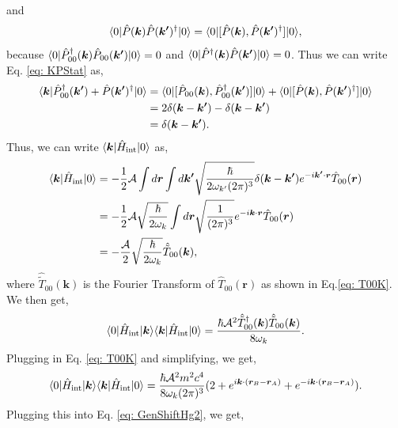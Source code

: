 \documentclass[12pt,a4paper]{report}
\theoremstyle{plain}
\theoremstyle{definition}
\theoremstyle{remark}
\renewcommand{\dag}{\dagger}
\newcommand{\Hint}{\hat{H}_{\text{int}}}
\DeclarePairedDelimiter\bra{\langle}{\rvert}
\DeclarePairedDelimiter\ket{\lvert}{\rangle}
\begin{document}
and
\begin{equation}
    \bra{0}\hat{P}(\bm{k})\hat{P}(\bm{k'})^{\dag}\ket{0} = \bra{0}[\hat{P}(\bm{k}), \hat{P}(\bm{k'})^{\dag}]\ket{0},
\end{equation}
because $\bra{0}\hat{P}_{00}^{\dag}(\bm{k})\hat{P}_{00}(\bm{k'})\ket{0} = 0$ and $\bra{0}\hat{P}^{\dag}(\bm{k})\hat{P}(\bm{k'})\ket{0} = 0$. Thus we can write Eq. \ref{eq: KPStat} as,
\begin{equation}
    \begin{aligned}
        \bra{\bm{k}}\hat{P}_{00}^{\dag}(\bm{k'}) + \hat{P}(\bm{k'})^{\dag}\ket{0} &= \bra{0}[\hat{P}_{00}(\bm{k}), \hat{P}_{00}^{\dag}(\bm{k'})]\ket{0} + \bra{0}[\hat{P}(\bm{k}), \hat{P}(\bm{k'})^{\dag}]\ket{0} \\
        &= 2\delta(\bm{k} - \bm{k'}) - \delta(\bm{k} - \bm{k'}) \\
        &= \delta(\bm{k} - \bm{k'}).
    \end{aligned}
\end{equation}
Thus, we can write $\bra{\bm{k}}\Hint\ket{0}$ as,
\begin{equation}
    \begin{aligned}
        \bra{\bm{k}}\Hint\ket{0} &= -\frac{1}{2} \mathcal{A} \int d{\bm{r}} \int d\bm{k'} \sqrt{\frac{\hbar}{2\omega_{k'} (2\pi)^3}} \delta(\bm{k} - \bm{k'}) e^{-i\bm{k'}\cdot\bm{r}} \hat{T}_{00}(\bm{r}) \\
        &= -\frac{1}{2} \mathcal{A} \sqrt{\frac{\hbar}{2\omega_{k}}} \int d{\bm{r}} \sqrt{\frac{1}{(2\pi)^3}} e^{-i\bm{k}\cdot\bm{r}} \hat{T}_{00}(\bm{r})\\
        &= -\frac{\mathcal{A}}{2} \sqrt{\frac{\hbar}{2\omega_{k}}} \hat{\tilde{T}}_{00}(\bm{k}),
    \end{aligned}
\end{equation}
where $\hat{\tilde{T}}_{00}(\bm{k})$ is the Fourier Transform of $\hat{T}_{00}(\bm{r})$ as shown in Eq.\ref{eq: T00K}. We then get,
\begin{equation}
    \bra{0}\Hint\ket{\bm{k}}\bra{\bm{k}}\Hint\ket{0} = \frac{\hbar \mathcal{A}^2 \hat{\tilde{T}}_{00}^{\dag}(\bm{k}) \hat{\tilde{T}}_{00}(\bm{k})}{8 \omega_k}.
\end{equation}
Plugging in Eq. \ref{eq: T00K} and simplifying, we get,
\begin{equation}
    \bra{0}\Hint\ket{\bm{k}}\bra{\bm{k}}\Hint\ket{0} = \frac{\hbar \mathcal{A}^2 m^2 c^4}{8 \omega_k (2\pi)^3}(2 + e^{i\bm{k}\cdot(\bm{r}_B - \bm{r}_A)} + e^{-i\bm{k}\cdot(\bm{r}_B - \bm{r}_A)}).
\end{equation}
Plugging this into Eq. \ref{eq: GenShiftHg2}, we get,
\end{document}
